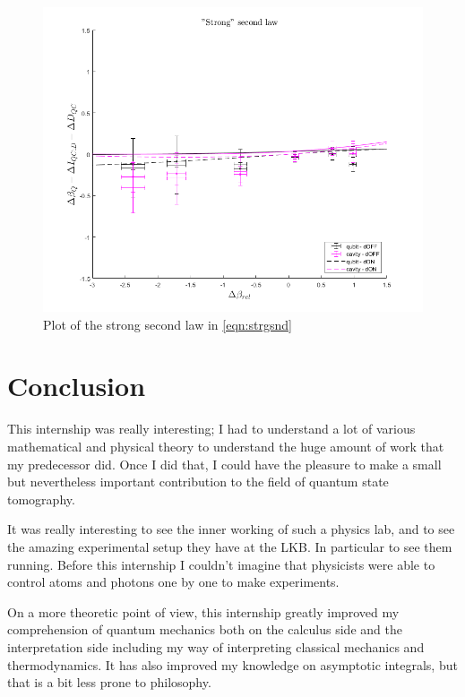\documentclass[10pt,a4paper]{report}
\theoremstyle{plain}
\theoremstyle{definition}
\theoremstyle{remark}
\begin{document}
\begin{figure}
  \centering
  \includegraphics[height=0.45\textheight]{plots/Strg2.png}
  \caption{Plot of the strong second law in \cref{eqn:strgsnd}}\label{fig:strg2}
\end{figure}


\chapter*{Conclusion} %

This internship was really interesting; I had to understand a lot of various
mathematical and physical theory to understand the huge amount of work that my
predecessor did. Once I did that, I could have the pleasure to make a small but
nevertheless important
contribution to the field of quantum state tomography.

It was really interesting to see the inner working of such a physics lab, and
to see the amazing experimental setup they have at the LKB. In particular to see
them running. Before
this internship I couldn't imagine that physicists were able to control atoms
and photons one by one to make experiments.

On a more theoretic point of view, this internship greatly improved my
comprehension of quantum mechanics both on the calculus side and the
interpretation side including my way of interpreting classical mechanics and
thermodynamics. It has also improved my knowledge on asymptotic integrals, but
that is a bit less prone to philosophy.
\end{document}
